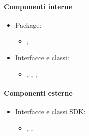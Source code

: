 \documentclass[../Funzionalita.tex]{subfiles}
\begin{document}
			\paragraph*{Componenti interne}
			\begin{itemize}
			
				\item Package:
				\begin{itemize}
					\item[] \usersetting;
				\end{itemize}
				
				\item Interfacce e classi:
				\begin{itemize}
					\item[] \Setting, \SettingImp, \PathPreference;
				\end{itemize}
				
			\end{itemize}
			
			
			\paragraph*{Componenti esterne}
			
			\begin{itemize}
				\item Interfacce e classi SDK:
				\begin{itemize}
					\item[] \SharedPreferences, \SharedPreferenceEditor.
				\end{itemize}
			\end{itemize}
\end{document}
